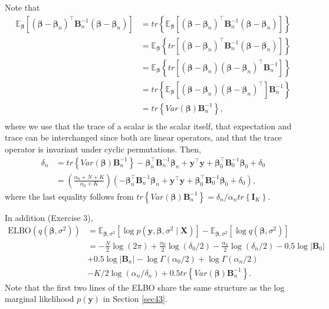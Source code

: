 Note that
\begin{align*}
	\mathbb{E}_{\boldsymbol{\beta}}\left[(\boldsymbol{\beta}-\boldsymbol{\beta}_n)^{\top}\boldsymbol{B}_n^{-1}(\boldsymbol{\beta}-\boldsymbol{\beta}_n)\right]&=tr\left\{\mathbb{E}_{\boldsymbol{\beta}}\left[(\boldsymbol{\beta}-\boldsymbol{\beta}_n)^{\top}\boldsymbol{B}_n^{-1}(\boldsymbol{\beta}-\boldsymbol{\beta}_n)\right]\right\}\\
	&=\mathbb{E}_{\boldsymbol{\beta}}\left\{tr\left[(\boldsymbol{\beta}-\boldsymbol{\beta}_n)^{\top}\boldsymbol{B}_n^{-1}(\boldsymbol{\beta}-\boldsymbol{\beta}_n)\right]\right\}\\
	&=\mathbb{E}_{\boldsymbol{\beta}}\left\{tr\left[(\boldsymbol{\beta}-\boldsymbol{\beta}_n)(\boldsymbol{\beta}-\boldsymbol{\beta}_n)^{\top}\boldsymbol{B}_n^{-1}\right]\right\}\\
	&=tr\left\{\mathbb{E}_{\boldsymbol{\beta}}\left[(\boldsymbol{\beta}-\boldsymbol{\beta}_n)(\boldsymbol{\beta}-\boldsymbol{\beta}_n)^{\top}\right]\boldsymbol{B}_n^{-1}\right\}\\
	&=tr\left\{Var(\boldsymbol{\beta})\boldsymbol{B}_n^{-1}\right\},\\
\end{align*}
where we use that the trace of a scalar is the scalar itself, that expectation and trace can be interchanged since both are linear operators, and that the trace operator is invariant under cyclic permutations.
Then, \begin{align*}
	\delta_n&=tr\left\{Var(\boldsymbol{\beta})\boldsymbol{B}_n^{-1}\right\}-\boldsymbol{\beta}_n^{\top}\boldsymbol{B}_n^{-1}\boldsymbol{\beta}_n+\boldsymbol{y}^{\top}\boldsymbol{y}+\boldsymbol{\beta}_0^{\top}\boldsymbol{B}_0^{-1}\boldsymbol{\beta}_0+\delta_0\\
	&=\left(\frac{\alpha_0+N+K}{\alpha_0+K}\right)\left(-\boldsymbol{\beta}_n^{\top}\boldsymbol{B}_n^{-1}\boldsymbol{\beta}_n+\boldsymbol{y}^{\top}\boldsymbol{y}+\boldsymbol{\beta}_0^{\top}\boldsymbol{B}_0^{-1}\boldsymbol{\beta}_0+\delta_0\right),
\end{align*}
where the last equality follows from $tr\left\{Var(\boldsymbol{\beta})\boldsymbol{B}_n^{-1}\right\}=\delta_n/\alpha_n tr\left\{\boldsymbol{I}_K\right\}$.
 
In addition (Exercise 3),
\begin{align*}
	\text{ELBO}(q(\boldsymbol{\beta},\sigma^2))&=\mathbb{E}_{\boldsymbol{\beta},\sigma^2}[\log p(\boldsymbol{y},\boldsymbol{\beta},\sigma^2\mid\boldsymbol{X})]-\mathbb{E}_{\boldsymbol{\beta},\sigma^2}[\log q(\boldsymbol{\beta},\sigma^2)]\\
	&=-\frac{N}{2}\log(2\pi)+\frac{\alpha_0}{2}\log(\delta_0/2)-\frac{\alpha_n}{2}\log(\delta_n/2)-0.5\log|\boldsymbol{B}_0|\\
	&+0.5\log|\boldsymbol{B}_n|-\log\Gamma(\alpha_0/2)+\log\Gamma(\alpha_n/2)\\
	&-K/2\log(\alpha_n/\delta_n)+0.5tr\left\{Var(\boldsymbol{\beta})\boldsymbol{B}_n^{-1}\right\}.
\end{align*}
Note that the first two lines of the ELBO share the same structure as the log marginal likelihood $p(\boldsymbol{y})$ in Section \ref{sec43}.

